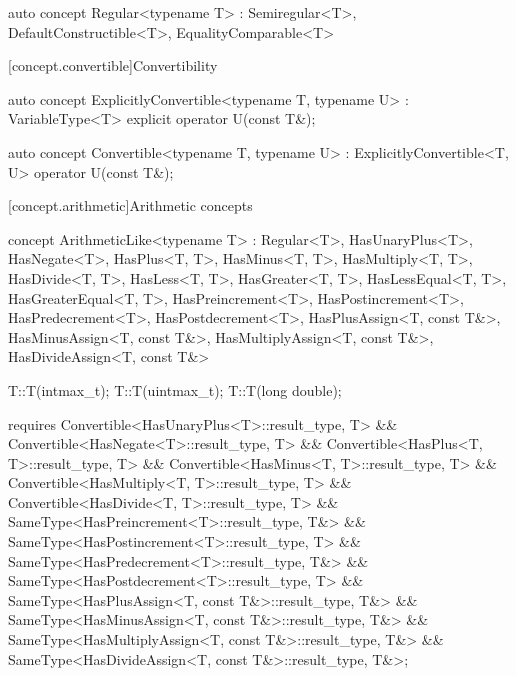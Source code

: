 \documentclass[american,twoside]{book}
\begin{document}
\begin{itemdecl}
auto concept Regular<typename T> 
  : Semiregular<T>, DefaultConstructible<T>, EqualityComparable<T> { }
\end{itemdecl}

\begin{itemdescr}
\pnum
{}
\end{itemdescr}

[concept.convertible]{Convertibility}

\begin{itemdecl}
auto concept ExplicitlyConvertible<typename T, typename U> : VariableType<T> {
  explicit operator U(const T&);
}
\end{itemdecl}

\begin{itemdescr}
\pnum
{}
\end{itemdescr}

\begin{itemdecl}
auto concept Convertible<typename T, typename U> : ExplicitlyConvertible<T, U> {
  operator U(const T&);
}
\end{itemdecl}

\begin{itemdescr}
\pnum
{}
\end{itemdescr}

[concept.arithmetic]{Arithmetic concepts}

\begin{itemdecl}
concept ArithmeticLike<typename T> 
  : Regular<T>, HasUnaryPlus<T>, HasNegate<T>,
    HasPlus<T, T>, HasMinus<T, T>, HasMultiply<T, T>, HasDivide<T, T>, 
    HasLess<T, T>, HasGreater<T, T>, HasLessEqual<T, T>, HasGreaterEqual<T, T>,
    HasPreincrement<T>, HasPostincrement<T>, HasPredecrement<T>, HasPostdecrement<T>,
    HasPlusAssign<T, const T&>, HasMinusAssign<T, const T&>,
    HasMultiplyAssign<T, const T&>, HasDivideAssign<T, const T&> {
  T::T(intmax_t);
  T::T(uintmax_t);
  T::T(long double);

  requires Convertible<HasUnaryPlus<T>::result_type, T>
        && Convertible<HasNegate<T>::result_type, T>
        && Convertible<HasPlus<T, T>::result_type, T>
        && Convertible<HasMinus<T, T>::result_type, T>
        && Convertible<HasMultiply<T, T>::result_type, T>
        && Convertible<HasDivide<T, T>::result_type, T>
        && SameType<HasPreincrement<T>::result_type, T&>
        && SameType<HasPostincrement<T>::result_type, T>
        && SameType<HasPredecrement<T>::result_type, T&>
        && SameType<HasPostdecrement<T>::result_type, T>
        && SameType<HasPlusAssign<T, const T&>::result_type, T&>
        && SameType<HasMinusAssign<T, const T&>::result_type, T&>
        && SameType<HasMultiplyAssign<T, const T&>::result_type, T&>
        && SameType<HasDivideAssign<T, const T&>::result_type, T&>;
}
\end{itemdecl}
\end{document}
